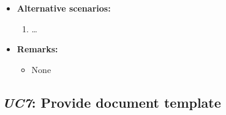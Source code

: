 \documentclass[a4paper,10pt]{article}
\begin{document}
\begin{itemize}
    \item \textbf{Alternative scenarios:} 
    \begin{enumerate}
        \item \ldots
    \end{enumerate}
    
    \item \textbf{Remarks:}
        \begin{itemize}
        	\item None
        \end{itemize}
\end{itemize}


\subsection{\emph{UC7}: Provide document template}
\end{document}
